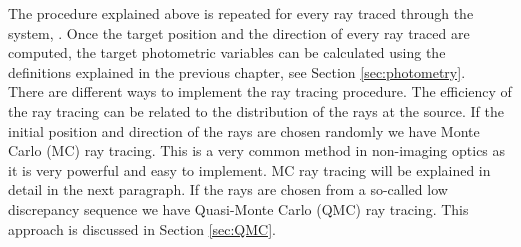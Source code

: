 The procedure explained above is repeated for every ray traced through the system, \cite{Gross2005Handbook}. 
Once the target position and the direction of every ray traced are computed, the target photometric variables can be calculated using the definitions explained in the previous chapter, see Section \ref{sec:photometry}.
\\ \indent
There are different ways to implement the ray tracing procedure. The efficiency of the ray tracing can be related to the distribution of the rays at the source. 
If the initial position and direction of the rays are chosen randomly we have Monte Carlo (MC) ray tracing. 
This is a very common method in non-imaging optics as it is very powerful and easy to implement. MC ray tracing will be explained in detail in the next paragraph.
If the rays are chosen from a so-called low discrepancy sequence we have Quasi-Monte Carlo (QMC) ray tracing.
This approach is discussed in Section \ref{sec:QMC}.
